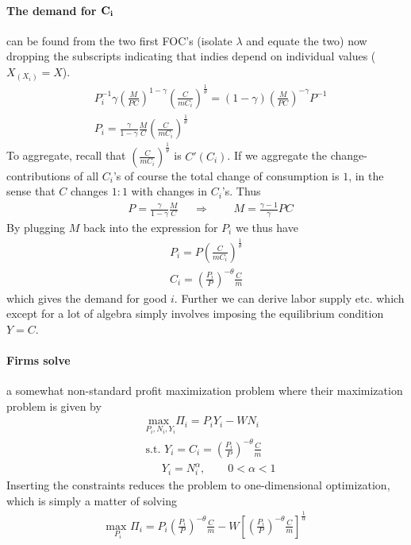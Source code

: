 \documentclass[12pt, a4paper]{article}
\begin{document}
\begin{spacing}{1.213}
\paragraph{The demand for $\bf C_i$}can be found from the two first FOC's (isolate $\lambda$ and equate the two) now dropping the subscripts indicating that indies depend on individual values ($X_{(X_i)}=X$).
\begin{align*}
&P_i^{-1}\gamma \left( \frac{M}{PC}\right)^{1- \gamma} \left(\frac{C}{m C_i}\right)^{\frac{1}{\theta}} = (1-\gamma)\left( \frac{M}{PC}\right)^{-\gamma} P^{-1} \\
& P_i = \frac{\gamma}{1-\gamma} \frac{M}{C} \left(\frac{C}{m C_i}\right)^{\frac{1}{\theta}}
\end{align*}
To aggregate, recall that $\left( \frac{C}{mC_i}\right)^{\frac{1}{\theta}}$ is $C'(C_i)$. If we aggregate the change-contributions of all $C_i$'s of course the total change of consumption is $1$, in the sense that $C$ changes $1:1$ with changes in $C_i$'s. Thus
\begin{align*}
&P = \frac{\gamma}{1-\gamma}\frac{M}{C} && \Rightarrow &&& M= \frac{\gamma-1}{\gamma} PC
\end{align*}
By plugging $M$ back into the expression for $P_i$ we thus have
\begin{align*}
P_i = P \left( \frac{C}{mC_i} \right)^{\frac{1}{\theta}} \\
C_i = \left( \frac{P_i}{P} \right)^{-\theta} \frac{C}{m}
\end{align*}
which gives the demand for good $i$. Further we can derive labor supply etc. which except for a lot of algebra simply involves imposing the equilibrium condition $Y=C$.

\paragraph{Firms solve} a somewhat non-standard profit maximization problem where their maximization problem is given by
\begin{align*}
&\underset{P_i, N_i, Y_i}{\text{max }} \Pi_i = P_i Y_i - W N_i \\
&\textrm{s.t. } Y_i = C_i = \left( \frac{P_i}{P} \right)^{-\theta} \frac{C}{m} \\
& \ \   \quad Y_i = N_i^{\alpha}, \qquad 0 < \alpha < 1
\end{align*}
Inserting the constraints reduces the problem to one-dimensional optimization, which is simply a matter of solving
\begin{align*}
\underset{P_i}{\text{max }} \Pi_i = P_i\left( \frac{P_i}{P} \right)^{-\theta} \frac{C}{m} - W \left[ \left( \frac{P_i}{P} \right)^{-\theta} \frac{C}{m} \right]^{\frac{1}{\alpha}}
\end{align*}


\end{spacing}
\end{document}
